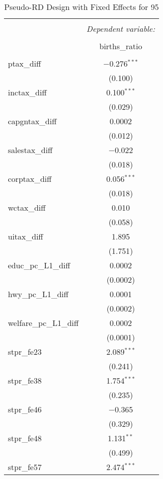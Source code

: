 
\begin{table}[!htbp] \centering 
  \caption{Pseudo-RD Design with Fixed Effects for  95} 
  \label{} 
\begin{tabular}{@{\extracolsep{5pt}}lc} 
\\[-1.8ex]\hline 
\hline \\[-1.8ex] 
 & \multicolumn{1}{c}{\textit{Dependent variable:}} \\ 
\cline{2-2} 
\\[-1.8ex] & births\_ratio \\ 
\hline \\[-1.8ex] 
 ptax\_diff & $-$0.276$^{***}$ \\ 
  & (0.100) \\ 
  inctax\_diff & 0.100$^{***}$ \\ 
  & (0.029) \\ 
  capgntax\_diff & 0.0002 \\ 
  & (0.012) \\ 
  salestax\_diff & $-$0.022 \\ 
  & (0.018) \\ 
  corptax\_diff & 0.056$^{***}$ \\ 
  & (0.018) \\ 
  wctax\_diff & 0.010 \\ 
  & (0.058) \\ 
  uitax\_diff & 1.895 \\ 
  & (1.751) \\ 
  educ\_pc\_L1\_diff & 0.0002 \\ 
  & (0.0002) \\ 
  hwy\_pc\_L1\_diff & 0.0001 \\ 
  & (0.0002) \\ 
  welfare\_pc\_L1\_diff & 0.0002 \\ 
  & (0.0001) \\ 
  stpr\_fe23 & 2.089$^{***}$ \\ 
  & (0.241) \\ 
  stpr\_fe38 & 1.754$^{***}$ \\ 
  & (0.235) \\ 
  stpr\_fe46 & $-$0.365 \\ 
  & (0.329) \\ 
  stpr\_fe48 & 1.131$^{**}$ \\ 
  & (0.499) \\ 
  stpr\_fe57 & 2.474$^{***}$ \\ 

\end{tabular}
\end{table}
